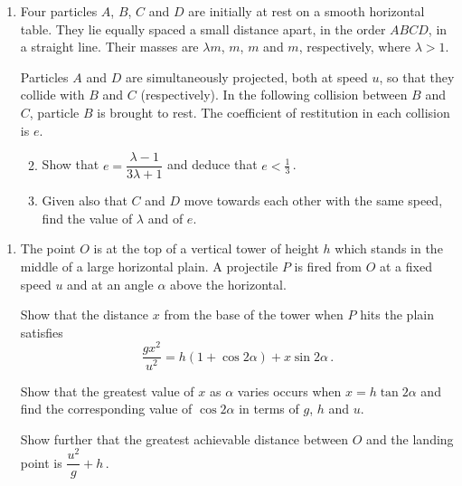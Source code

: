 \documentclass[a4, 11pt]{report}
\newlength{\qspace}
\newcounter{qnumber}
\newenvironment{question}%
 {\vspace{\qspace}
  \begin{enumerate}[\bfseries 1\quad][10]%
    \setcounter{enumi}{\value{qnumber}}%
    \item%
 }
{
  \end{enumerate}
  \filbreak
  \stepcounter{qnumber}
 }
\newenvironment{questionparts}[1][1]%
 {
  \begin{enumerate}[\bfseries (i)]%
    \setcounter{enumii}{#1}
    \addtocounter{enumii}{-1}
    \setlength{\itemsep}{5mm}
    \setlength{\parskip}{8pt}
 }
 {
  \end{enumerate}
 }
\begin{document}
\begin{question}
Four particles  $A$, $B$, $C$ and $D$ 
are initially at rest 
on a smooth horizontal table. They lie
equally spaced a small distance apart, in the order $ABCD$, 
in a straight line.
Their  masses are $\lambda m$, $m$, $m$ and $m$,
respectively, where $\lambda>1$.

Particles $A$ and $D$ are simultaneously  projected, both at speed $u$,
so that they collide with $B$ and $C$ 
(respectively). In the following collision between $B$ and $C$,
particle $B$ 
is brought to rest. The coefficient of restitution in each collision is $e$.

\begin{questionparts}
\item Show that $e = \dfrac {\lambda-1}{3\lambda+1}$ and 
deduce that $e<   \frac 13\,$. 
\item Given also that $C$ and $D$ move towards each other with the
same speed,  find the value of  $\lambda$ and of $e$.
\end{questionparts}


\end{question}
\begin{question}
The point $O$ is at the top of a vertical tower 
of height $h$ which stands in the middle of a large horizontal
	plain. A projectile $P$ is fired from $O$ 
at a fixed speed $u$ and at an angle $\alpha$
 above the horizontal.

Show that the distance $x$ from the base of the tower
when $P$ hits the plain satisfies
\[
\frac{gx^2}{u^2} =
h(1+\cos 2\alpha) + x \sin 2\alpha \,.
\] 

Show that the greatest value of $x$ as $\alpha$ varies
occurs when $x=h\tan2\alpha$ and 
find the corresponding value of $\cos 2\alpha$ in terms of $g$, $h$ and $u$.

Show further that the greatest achievable 
distance between $O$ and the landing point is $\dfrac {u^2}g +h\,$. 

\end{question}
\newpage
\end{document}
